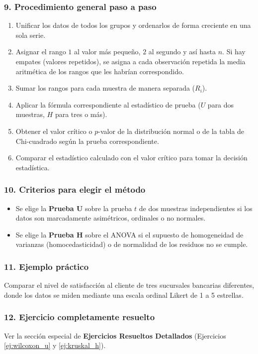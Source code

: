 \documentclass[11pt,a4paper]{article}
\begin{document}
\subsubsection{9. Procedimiento general paso a paso}
\begin{enumerate}
    \item Unificar los datos de todos los grupos y ordenarlos de forma creciente en una sola serie.
    \item Asignar el rango $1$ al valor más pequeño, $2$ al segundo y así hasta $n$. Si hay empates (valores repetidos), se asigna a cada observación repetida la media aritmética de los rangos que les habrían correspondido.
    \item Sumar los rangos para cada muestra de manera separada ($R_i$).
    \item Aplicar la fórmula correspondiente al estadístico de prueba ($U$ para dos muestras, $H$ para tres o más).
    \item Obtener el valor crítico o $p$-valor de la distribución normal o de la tabla de Chi-cuadrado según la prueba correspondiente.
    \item Comparar el estadístico calculado con el valor crítico para tomar la decisión estadística.
\end{enumerate}

\subsubsection{10. Criterios para elegir el método}
\begin{itemize}
    \item Se elige la \textbf{Prueba U} sobre la prueba $t$ de dos muestras independientes si los datos son marcadamente asimétricos, ordinales o no normales.
    \item Se elige la \textbf{Prueba H} sobre el ANOVA si el supuesto de homogeneidad de varianzas (homocedasticidad) o de normalidad de los residuos no se cumple.
\end{itemize}

\subsubsection{11. Ejemplo práctico}
Comparar el nivel de satisfacción al cliente de tres sucursales bancarias diferentes, donde los datos se miden mediante una escala ordinal Likert de 1 a 5 estrellas.

\subsubsection{12. Ejercicio completamente resuelto}
Ver la sección especial de \textbf{Ejercicios Resueltos Detallados} (Ejercicios \ref{ej:wilcoxon_u} y \ref{ej:kruskal_h}).
\end{document}
